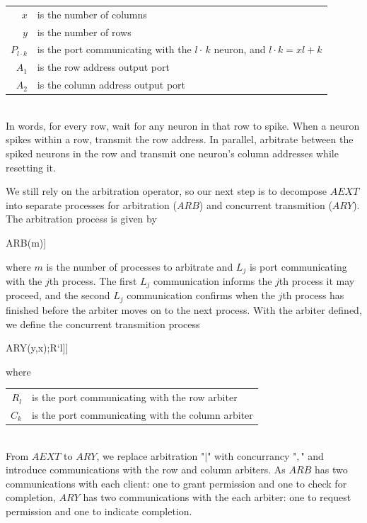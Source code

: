 \documentclass[aer.tex]{subfiles}
\begin{document}
\begin{tabular}[]{rl}
$x$ & is the number of columns \\
$y$ & is the number of rows \\
$P_{l\cdot k}$ & is the port communicating with the $l\cdot\,k$ neuron, and $l\cdot k=xl+k$  \\
$A_1$ & is the row address output port \\
$A_2$ & is the column address output port \\
\end{tabular} \\

In words, for every row, wait for any neuron in that row to spike.
When a neuron spikes within a row, transmit the row address. In parallel,
arbitrate between the spiked neurons in the row 
and transmit one neuron's column addresses while resetting it.

We still rely on the arbitration operator, 
so our next step is to decompose $AEXT$ into separate processes for 
arbitration ($ARB$) and concurrent transmition ($ARY$). The arbitration process is given by

\begin{csp}
ARB(m)\equiv*[[\langle\|j:1..m:#{L`j}->L`j;L`j\rangle]]
\end{csp}
where $m$ is the number of processes to arbitrate and $L_j$ is port communicating with the $j$th process.
The first $L_j$ communication informs the $j$th process it may proceed, 
and the second $L_j$ communication confirms when the $j$th process has finished 
before the arbiter moves on to the next process. 
With the arbiter defined, we define the concurrent transmition process

\begin{csp}
ARY(y,x)\equiv*[[\langle,l:1..y:\langle|k:1..x:#{P`{l\cdot\,k}}\rangle->R`l;A`1!enc(l)
             ,[\langle,k:1..x:#{P`{l\cdot\,k}}->C`k;A`2!enc(k),P`{l\cdot\,k};C`k\rangle];R`l\rangle]]
\end{csp}
where

\begin{tabular}[]{rl}
$R_l$ & is the port communicating with the row arbiter \\
$C_k$ & is the port communicating with the column arbiter \\
\end{tabular} \\

From $AEXT$ to $ARY$, we replace arbitration "$\vert$" with concurrancy "$,$" and
introduce communications with the row and column arbiters.
As $ARB$ has two communications with each client: one to grant permission and one to check for 
completion, $ARY$ has two communications with the each arbiter: one to request permission and
one to indicate completion.
\end{document}
